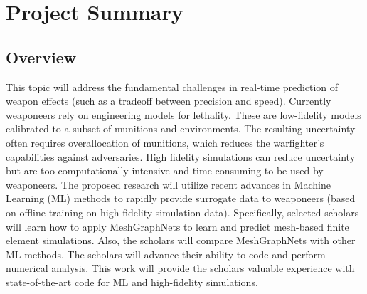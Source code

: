 \section{Project Summary}
\subsection{Overview} 
This topic will address the fundamental challenges in real-time prediction of weapon effects (such as a tradeoff between precision and speed). Currently weaponeers rely on engineering models for lethality. These are low-fidelity models calibrated to a subset of munitions and environments. The resulting uncertainty often requires overallocation of munitions, which reduces the warfighter’s capabilities against adversaries. High fidelity simulations can reduce uncertainty but are too computationally intensive and time consuming to be used by weaponeers. The proposed research will utilize recent advances in Machine Learning (ML) methods to rapidly provide surrogate data to weaponeers (based on offline training on high fidelity simulation data). Specifically, selected scholars will learn how to apply MeshGraphNets to learn and predict mesh-based finite element simulations. Also, the scholars will compare MeshGraphNets with other ML methods. The scholars will advance their ability to code and perform numerical analysis. This work will provide the scholars valuable experience with state-of-the-art code for ML and high-fidelity simulations.\\
